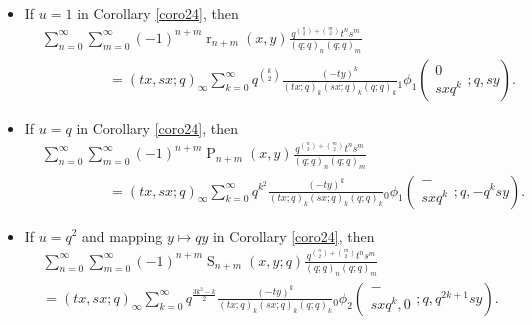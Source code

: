 \documentclass{cimart}
\DeclareMathOperator{\opP}{P}
\DeclareMathOperator{\opr}{r}
\DeclareMathOperator{\opS}{S}
\begin{document}
\begin{itemize}
    \item 
    If $u=1$ in Corollary \ref{coro24}, then
\begin{align}
    &\sum_{n=0}^{\infty}\sum_{m=0}^{\infty}(-1)^{n+m}\opr_{n+m}(x,y)\frac{q^{\binom{n}{2}+\binom{m}{2}}t^{n}s^{m}}{(q;q)_{n}(q;q)_{m}}\nonumber\\
        &\hspace{2cm}=(tx,sx;q)_{\infty}\sum_{k=0}^{\infty}q^{\binom{k}{2}}\frac{(-ty)^k}{(tx;q)_{k}(sx;q)_{k}(q;q)_{k}}{}_{1}\phi_{1}\left(
        \begin{array}{c}
             0 \\
             sxq^k
        \end{array};
        q,sy
        \right).
\end{align}

    \item 
If $u=q$ in Corollary \ref{coro24}, then
\begin{align}
    &\sum_{n=0}^{\infty}\sum_{m=0}^{\infty}(-1)^{n+m}\opP_{n+m}(x,y)\frac{q^{\binom{n}{2}+\binom{m}{2}}t^{n}s^{m}}{(q;q)_{n}(q;q)_{m}}\nonumber\\
        &\hspace{2cm}=(tx,sx;q)_{\infty}\sum_{k=0}^{\infty}q^{k^2}\frac{(-ty)^k}{(tx;q)_{k}(sx;q)_{k}(q;q)_{k}}{}_{0}\phi_{1}\left(
        \begin{array}{c}
             - \\
             sxq^k
        \end{array};
        q,-q^ksy
        \right).
\end{align}

    \item 
If $u=q^2$ and mapping $y\mapsto qy$ in Corollary \ref{coro24}, then
\begin{align}
    &\sum_{n=0}^{\infty}\sum_{m=0}^{\infty}(-1)^{n+m}\opS_{n+m}(x,y;q)\frac{q^{\binom{n}{2}+\binom{m}{2}}t^{n}s^{m}}{(q;q)_{n}(q;q)_{m}}\nonumber\\
        &=(tx,sx;q)_{\infty}\sum_{k=0}^{\infty}q^{\frac{3k^2-k}{2}}\frac{(-ty)^k}{(tx;q)_{k}(sx;q)_{k}(q;q)_{k}}{}_{0}\phi_{2}\left(
        \begin{array}{c}
             - \\
             sxq^k,0
        \end{array};
        q,q^{2k+1}sy
        \right).
\end{align}


\end{itemize}
\end{document}
